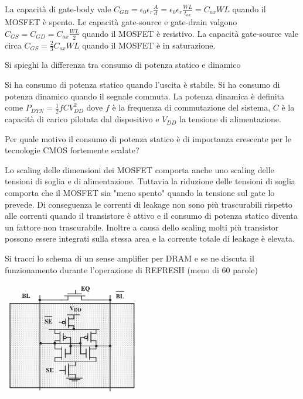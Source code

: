 \documentclass[answers,a4paper,12pt]{exam}
\begin{document}
\begin{questions}
\begin{solutionorbox}[5cm]
{}


La capacità di gate-body vale $C_{GB} = \epsilon_0 \epsilon_r \frac{A}{d} = \epsilon_0 \epsilon_r \frac{WL}{t_{ox}} = C_{ox} W L$ quando il MOSFET è spento.
Le capacità gate-source e gate-drain valgono $C_{GS} = C_{GD} = C_{ox} \frac{W L}{2}$ quando il MOSFET è resistivo.
La capacità gate-source vale circa $C_{GS} = \frac{2}{3} C_{ox} W L$ quando il MOSFET è in saturazione.
\end{solutionorbox}
\question Si spieghi la differenza tra consumo di potenza statico e dinamico
\begin{solutionorbox}[5cm]
    Si ha consumo di potenza statico quando l'uscita è stabile.
    Si ha consumo di potenza dinamico quando il segnale commuta.
    La potenza dinamica è definita come $P_{DYN} = \frac{1}{2} f C V_{DD}^2$ dove $f$ è la frequenza di commutazione del sistema, $C$ è la capacità di carico pilotata dal dispositivo e $V_{DD}$ la tensione di alimentazione.
\end{solutionorbox}
\question Per quale motivo il consumo di potenza statico è di importanza crescente per le tecnologie CMOS fortemente scalate?
\begin{solutionorbox}[5cm]
    Lo scaling delle dimensioni dei MOSFET comporta anche uno scaling delle tensioni di soglia e di alimentazione. 
    Tuttavia la riduzione delle tensioni di soglia comporta che il MOSFET sia "meno spento" quando la tensione sul gate lo prevede. 
    Di conseguenza le correnti di leakage non sono più trascurabili rispetto alle correnti quando il transistore è attivo e il consumo di potenza statico diventa un fattore non trascurabile.
    Inoltre a causa dello scaling molti più transistor possono essere integrati sulla stessa area e la corrente totale di leakage è elevata.
\end{solutionorbox}
\pagebreak
\question Si tracci lo schema di un sense amplifier per DRAM e se ne discuta il funzionamento durante l’operazione di REFRESH (meno di 60 parole)
\begin{solutionorbox}[5cm]

    {\centering

\includegraphics[height=5cm]{SenseAmp}

}
\end{solutionorbox}
\end{questions}
\end{document}
